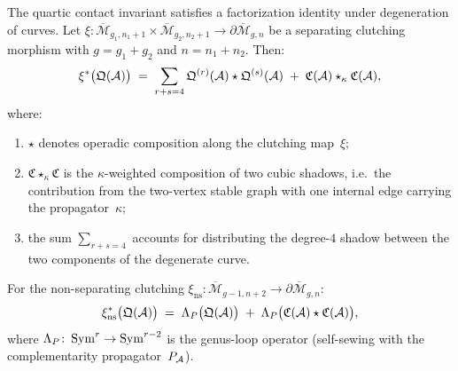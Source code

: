 \begin{theorem}
\label{thm:thqg-VI-clutching-law}
The quartic contact invariant satisfies a factorization identity
under degeneration of curves. Let
$\xi\colon \overline{\mathcal{M}}_{g_1,n_1+1} \times
\overline{\mathcal{M}}_{g_2,n_2+1} \to
\partial\overline{\mathcal{M}}_{g,n}$
be a separating clutching morphism with $g = g_1 + g_2$ and
$n = n_1 + n_2$. Then:
\begin{equation}\label{eq:thqg-VI-clutching-separating}
\xi^*\bigl(\mathfrak{Q}(\mathcal{A})\bigr)
\;=\;
\sum_{r+s=4}
\mathfrak{Q}^{(r)}(\mathcal{A}) \star \mathfrak{Q}^{(s)}(\mathcal{A})
\;+\;
\mathfrak{C}(\mathcal{A}) \star_\kappa \mathfrak{C}(\mathcal{A}),
\end{equation}
where:
\begin{enumerate}[label=\textup{(\roman*)}]
\item $\star$ denotes operadic composition along the clutching
 map~$\xi$;
\item $\mathfrak{C} \star_\kappa \mathfrak{C}$ is the
 $\kappa$-weighted composition of two cubic shadows, i.e.\ the
 contribution from the two-vertex stable graph with one internal
 edge carrying the propagator~$\kappa$;
\item the sum $\sum_{r+s=4}$ accounts for distributing the degree-$4$
 shadow between the two components of the degenerate curve.
\end{enumerate}

For the non-separating clutching
$\xi_{\mathrm{ns}}\colon \overline{\mathcal{M}}_{g-1,n+2}
\to \partial\overline{\mathcal{M}}_{g,n}$:
\begin{equation}\label{eq:thqg-VI-clutching-nonseparating}
\xi_{\mathrm{ns}}^*\bigl(\mathfrak{Q}(\mathcal{A})\bigr)
\;=\;
\Lambda_P\bigl(\mathfrak{Q}(\mathcal{A})\bigr)
\;+\;
\Lambda_P\bigl(\mathfrak{C}(\mathcal{A}) \star \mathfrak{C}(\mathcal{A})\bigr),
\end{equation}
where $\Lambda_P\colon \operatorname{Sym}^r \to \operatorname{Sym}^{r-2}$ is the genus-loop
operator (self-sewing with the complementarity propagator~$P_{\mathcal{A}}$).
\end{theorem}

